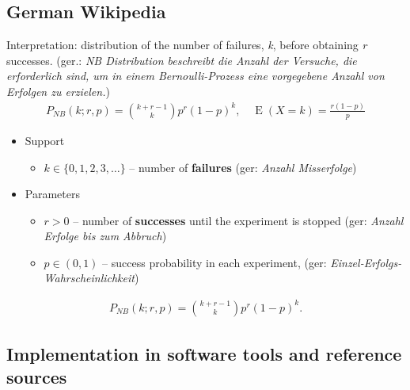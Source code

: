\subsection*{German Wikipedia}
Interpretation: distribution of the number of failures, \emph{k}, before obtaining \emph{r} successes. 
(ger.: \emph{NB Distribution beschreibt die Anzahl der Versuche, die erforderlich sind, um in einem 
Bernoulli-Prozess eine vorgegebene Anzahl von Erfolgen zu erzielen.})
\begin{align*}
P_{N\!B}(k;r,p) = {k + r - 1 \choose k} p^r (1-p)^k, \quad \operatorname E(X\!=\!k)=\frac{r(1-p)}{p}
\end{align*}
\begin{itemize}
\item 
Support
\begin{itemize}
\item 
$k \in \{ 0, 1, 2, 3, \dots\}$ -- number of \textbf{failures} (ger: \emph{Anzahl Misserfolge})
\end{itemize}
\item 
Parameters 
\begin{itemize}
\item 
$r > 0$ -- number of \textbf{successes} until the experiment is stopped (ger: \emph{Anzahl Erfolge bis zum Abbruch})
\item 
$p \in (0,1)$ -- success probability in each experiment, (ger: \emph{Einzel-Erfolgs-Wahrscheinlichkeit})
\end{itemize}
\end{itemize}
\begin{align*}
P_{N\!B}(k;r,p) = {k + r - 1 \choose k} p^r (1-p)^k  .
\end{align*}


\subsection{Implementation in software tools and reference sources}




















